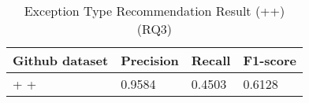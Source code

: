 \begin{table}[t]%
  \caption{Exception Type Recommendation Result (\xblock+\xstate+\xtype) (RQ3)}
  \vspace{-12pt}
  \small
	\begin{center}
		\renewcommand{\arraystretch}{1}
		\begin{tabular}{| p{3.10cm}<{\centering} | p{1.2cm}<{\centering} | p{1.2cm}<{\centering}| p{1.2cm}<{\centering}|}
		  \hline
			Github dataset  & Precision  & Recall & F1-score \\
			\hline
			\xblock + \xstate  + \xtype  & 0.9584  &  0.4503 & 0.6128\\
			\hline
		\end{tabular}
		\label{tab:xtype-4}
	\end{center}

\end{table}